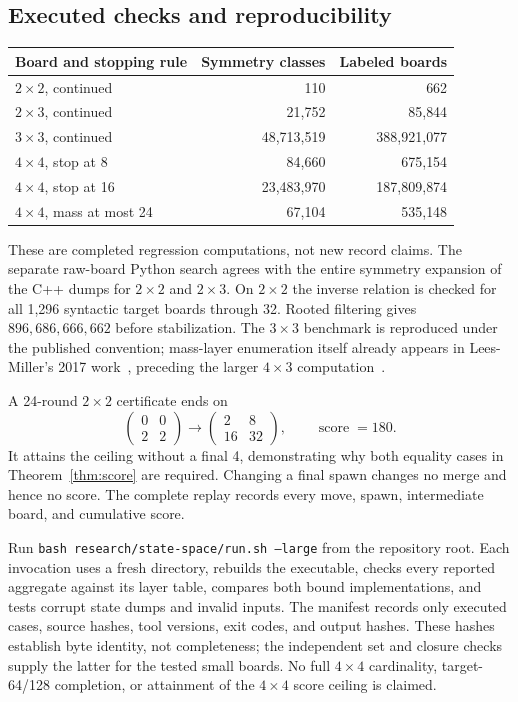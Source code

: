 \subsection{Executed checks and reproducibility}

\begin{center}
\small
\begin{tabular}{@{}lrr@{}}
\toprule
Board and stopping rule & Symmetry classes & Labeled boards\\
\midrule
$2\times2$, continued &110&662\\
$2\times3$, continued &21{,}752&85{,}844\\
$3\times3$, continued &48{,}713{,}519&388{,}921{,}077\\
$4\times4$, stop at 8 &84{,}660&675{,}154\\
$4\times4$, stop at 16 &23{,}483{,}970&187{,}809{,}874\\
$4\times4$, mass at most 24 &67{,}104&535{,}148\\
\bottomrule
\end{tabular}
\end{center}

These are completed regression computations, not new record claims.
The separate raw-board Python search agrees with the entire symmetry
expansion of the C++ dumps for $2\times2$ and $2\times3$. On $2\times2$
the inverse relation is checked for all 1,296 syntactic target boards
through 32. Rooted filtering gives $896,686,666,662$ before stabilization.
The $3\times3$ benchmark is reproduced under the published convention;
mass-layer enumeration itself already appears in Lees-Miller's 2017
work~\cite{leesmiller2017b}, preceding the larger
$4\times3$ computation~\cite{kaneko2026}.

A 24-round $2\times2$ certificate ends on
\[
 \begin{pmatrix}0&0\\2&2\end{pmatrix}
 \longrightarrow
 \begin{pmatrix}2&8\\16&32\end{pmatrix},
 \qquad\operatorname{score}=180.
\]
It attains the ceiling without a final 4, demonstrating why both equality
cases in Theorem~\ref{thm:score} are required. Changing a final spawn
changes no merge and hence no score. The complete replay records every
move, spawn, intermediate board, and cumulative score.

Run \texttt{bash research/state-space/run.sh --large} from the repository
root. Each invocation uses a fresh directory, rebuilds the executable,
checks every reported aggregate against its layer table, compares both
bound implementations, and tests corrupt state dumps and invalid inputs.
The manifest records only executed cases, source hashes, tool versions,
exit codes, and output hashes. These hashes establish byte identity, not
completeness; the independent set and closure checks supply the latter
for the tested small boards. No full $4\times4$ cardinality, target-64/128
completion, or attainment of the $4\times4$ score ceiling is claimed.
